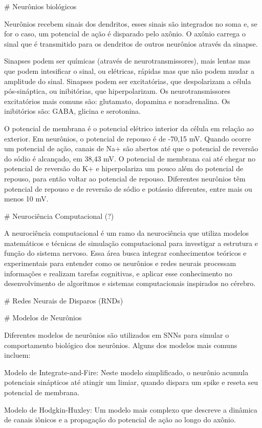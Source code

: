 # Neurônios biológicos

Neurônios recebem sinais dos dendritos, esses sinais são integrados no soma e, se for o caso, um potencial de ação é disparado
pelo axônio. O axônio carrega o sinal que é transmitido para os dendritos de outros neurônios através da sinapse.

Sinapses podem ser químicas (através de neurotransmissores), mais lentas mas que podem intesificar o sinal, ou elétricas, rápidas
mas que não podem mudar a amplitude do sinal. Sinapses podem ser excitatórias, que despolarizam a célula pós-sináptica, ou
inibitórias, que hiperpolarizam. Os neurotransmissores excitatórios mais comuns são: glutamato, dopamina e noradrenalina. Os
inibitórios são: GABA, glicina e serotonina.

O potencial de membrana é o potencial elétrico interior da célula em relação ao exterior. Em neurônios, o potencial de repouso é
de -70,15 mV. Quando ocorre um potencial de ação, canais de Na+ são abertos até que o potencial de reversão do sódio é alcançado,
em 38,43 mV. O potencial de membrana cai até chegar no potencial de reversão do K+ e hiperpolariza um pouco além do potencial de
repouso, para então voltar ao potencial de repouso. Diferentes neurônios têm potencial de repouso e de reversão de sódio e
potássio diferentes, entre mais ou menos 10 mV.

# Neurociência Computacional (?)

A neurociência computacional é um ramo da neurociência que utiliza modelos matemáticos e técnicas de simulação computacional para
investigar a estrutura e função do sistema nervoso. Essa área busca integrar conhecimentos teóricos e experimentais para entender
como os neurônios e redes neurais processam informações e realizam tarefas cognitivas, e aplicar esse conhecimento no
desenvolvimento de algoritmos e sistemas computacionais inspirados no cérebro.

# Redes Neurais de Disparos (RNDs)


# Modelos de Neurônios

Diferentes modelos de neurônios são utilizados em SNNs para simular o comportamento biológico dos neurônios. Alguns dos modelos
mais comuns incluem:

Modelo de Integrate-and-Fire: Neste modelo simplificado, o neurônio acumula potenciais sinápticos até atingir um limiar, quando
dispara um spike e reseta seu potencial de membrana.

Modelo de Hodgkin-Huxley: Um modelo mais complexo que descreve a dinâmica de
canais iônicos e a propagação do potencial de ação ao longo do axônio.

